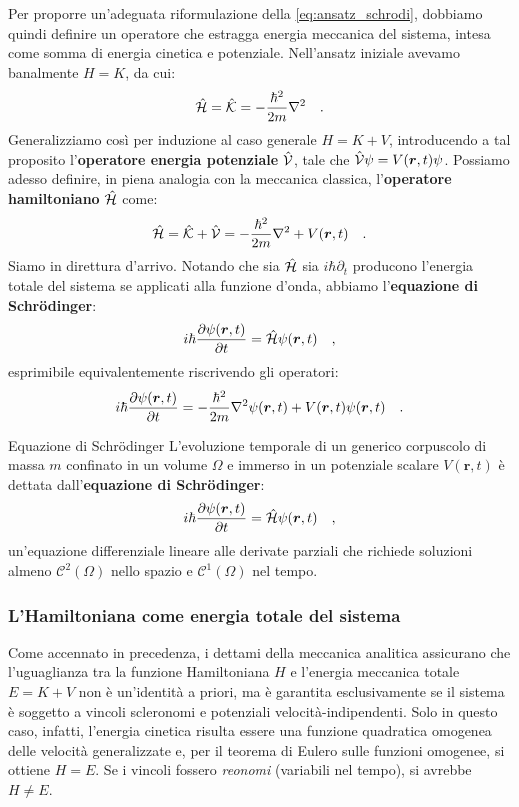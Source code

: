 Per proporre un'adeguata riformulazione della \eqref{eq:ansatz_schrodi}, dobbiamo quindi definire un operatore che estragga energia meccanica del sistema, intesa come somma di energia cinetica e potenziale. Nell'ansatz iniziale avevamo banalmente $H = K$, da cui:
\[
    \hat{\mathcal{H}} = \hat{\mathcal{K}} = -\frac{\hbar^2}{2m}\nabla^2 \quad.
\]
Generalizziamo così per induzione al caso generale $H = K + V$, introducendo a tal proposito l'\textbf{operatore energia potenziale} $\hat{\mathcal{V}}$, tale che $\hat{\mathcal{V}}\psi = V(\bm{r}, t)\psi$. 
Possiamo adesso definire, in piena analogia con la meccanica classica, l'\textbf{operatore hamiltoniano} $\hat{\mathcal{H}}$ come:
\[
    \hat{\mathcal{H}} = \hat{\mathcal{K}} + \hat{\mathcal{V}} = -\frac{\hbar^2}{2m}\nabla^2 + V(\bm{r},t) \quad.
\]
Siamo in direttura d'arrivo. Notando che sia $\hat{\mathcal{H}}$ sia $i\hbar \partial_t$ producono l'energia totale del sistema se applicati alla funzione d'onda, abbiamo l'\textbf{equazione di Schrödinger}:
\[
    {i\hbar \pdv{\psi(\bm{r},t)}{t} = \hat{\mathcal{H}}\psi(\bm{r},t)} \quad,
\]
esprimibile equivalentemente riscrivendo gli operatori:
\[
    i\hbar \pdv{\psi(\bm{r},t)}{t} = -\frac{\hbar^2}{2m}\nabla^2\psi(\bm{r},t) + V(\bm{r},t)\psi(\bm{r},t) \quad.
\]

\begin{concettochiave}{Equazione di Schrödinger}
    \noindent
    L'evoluzione temporale di un generico corpuscolo di massa $m$ confinato in un volume $\Omega$ e immerso in un potenziale scalare $V(\bm{r},t)$ è dettata dall'\textbf{equazione di Schrödinger}:
    \begin{equation}
        {i\hbar \pdv{\psi(\bm{r},t)}{t} = \hat{\mathcal{H}}\psi(\bm{r},t)} \quad,
        \label{eq:schrodinger_completa}
    \end{equation}
    un'equazione differenziale lineare alle derivate parziali che richiede soluzioni almeno $\mathcal{C}^2(\Omega)$ nello spazio e $\mathcal{C}^1(\Omega)$ nel tempo.
\end{concettochiave}

\subsubsection{L'Hamiltoniana come energia totale del sistema}
Come accennato in precedenza, i dettami della meccanica analitica assicurano che l'uguaglianza tra la funzione Hamiltoniana ${H}$ e l'energia meccanica totale $E = K + V$ non è un'identità a priori, ma è garantita esclusivamente se il sistema è soggetto a vincoli {scleronomi} e potenziali velocità-indipendenti. Solo in questo caso, infatti, l'energia cinetica risulta essere una funzione quadratica omogenea delle velocità generalizzate e, per il teorema di Eulero sulle funzioni omogenee, si ottiene ${H} = E$. Se i vincoli fossero \emph{reonomi} (variabili nel tempo), si avrebbe ${H} \neq E$. 


